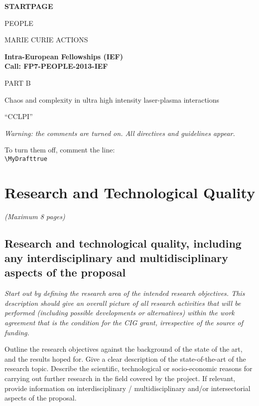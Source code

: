 \documentclass[a4paper,11pt]{article}
\title{\mytitle}
\newif\ifMyDraft%
\newcommand{\projectname}[0]{CCLPI}
\newcommand{\mytitle}{Chaos and complexity in ultra high intensity laser-plasma interactions}
\newenvironment{xcomment}{\em}{}
\newcommand{\cover}[1]{%
\newpage
\begin{center}
\vspace{4cm}
\textbf{#1}
\vspace{4cm}

PEOPLE

MARIE CURIE ACTIONS

\vspace{1cm}

\textbf{Intra-European Fellowships (IEF)}\\
\textbf{Call: FP7-PEOPLE-2013-IEF}

\vspace{4cm}

\Large{PART B}
\vspace{2cm}

\Huge{\mytitle}

\vspace{1cm}

\Large{``\projectname''}

\end{center}
\newpage
}
\begin{document}
\cover{STARTPAGE}

\newpage

\begin{xcomment} 
Warning: the comments are turned on. All directives and guidelines appear.

To turn them off, comment the line:\\ 
\verb|\MyDrafttrue|\\

\end{xcomment} 


\section{Research and Technological Quality}

\begin{xcomment}  
(Maximum 8 pages)  
\end{xcomment}

\subsection{Research and technological quality, including any interdisciplinary and multidisciplinary aspects of the proposal}

\begin{xcomment}  
Start out by defining the research area of the intended research
objectives. This description should give an overall picture of all
research activities that will be performed (including possible
developments or alternatives) within the work agreement that is the
condition for the CIG grant, irrespective of the source of funding.

Outline the research objectives against the background of the state of
the art, and the results hoped for. Give a clear description of the
state-of-the-art of the research topic. Describe the scientific,
technological or socio-economic reasons for carrying out further
research in the field covered by the project. If relevant, provide
information on interdisciplinary / multidisciplinary and/or
intersectorial aspects of the proposal.
\end{xcomment}
\end{document}
